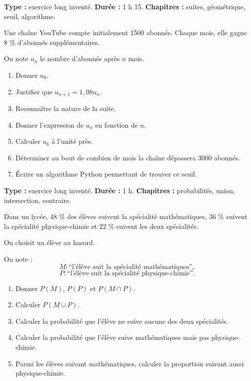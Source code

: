 \documentclass[11pt,a4paper]{article}
\begin{document}
\hypertarget{P-SUJET-06}{}
\begin{sujettype}
\textbf{Type :} exercice long inventé.  
\textbf{Durée :} 1 h 15.  
\textbf{Chapitres :} suites, géométrique, seuil, algorithme.

Une chaîne YouTube compte initialement 1500 abonnés. Chaque mois, elle gagne 8 \% d'abonnés supplémentaires.

On note $u_n$ le nombre d'abonnés après $n$ mois.

\begin{enumerate}
  \item Donner $u_0$.
  \item Justifier que $u_{n+1}=1{,}08u_n$.
  \item Reconnaître la nature de la suite.
  \item Donner l'expression de $u_n$ en fonction de $n$.
  \item Calculer $u_6$ à l'unité près.
  \item Déterminer au bout de combien de mois la chaîne dépassera 3000 abonnés.
  \item Écrire un algorithme Python permettant de trouver ce seuil.
\end{enumerate}
\end{sujettype}

\hypertarget{P-SUJET-07}{}
\begin{sujettype}
\textbf{Type :} exercice long inventé.  
\textbf{Durée :} 1 h.  
\textbf{Chapitres :} probabilités, union, intersection, contraire.

Dans un lycée, 48 \% des élèves suivent la spécialité mathématiques, 36 \% suivent la spécialité physique-chimie et 22 \% suivent les deux spécialités.

On choisit un élève au hasard.

On note :
\[
M : \text{``l'élève suit la spécialité mathématiques''},
\]
\[
P : \text{``l'élève suit la spécialité physique-chimie''}.
\]

\begin{enumerate}
  \item Donner $P(M)$, $P(P)$ et $P(M\cap P)$.
  \item Calculer $P(M\cup P)$.
  \item Calculer la probabilité que l'élève ne suive aucune des deux spécialités.
  \item Calculer la probabilité que l'élève suive mathématiques mais pas physique-chimie.
  \item Parmi les élèves suivant mathématiques, calculer la proportion suivant aussi physique-chimie.
\end{enumerate}
\end{sujettype}
\end{document}
